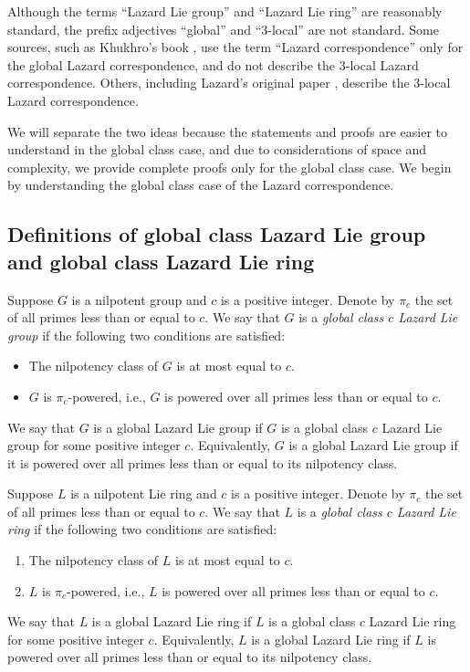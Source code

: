 Although the terms ``Lazard Lie group'' and ``Lazard Lie ring'' are
reasonably standard, the prefix adjectives ``global'' and ``3-local''
are not standard. Some sources, such as Khukhro's book \cite{Khukhro},
use the term ``Lazard correspondence'' only for the global Lazard
correspondence, and do not describe the $3$-local Lazard
correspondence. Others, including Lazard's original paper
\cite{Lazardsoriginal}, describe the $3$-local Lazard correspondence.

We will separate the two ideas because the statements and proofs are
easier to understand in the global class case, and due to
considerations of space and complexity, we provide complete proofs
only for the global class case. We begin by understanding the global
class case of the Lazard correspondence.

\subsection{Definitions of global class Lazard Lie group and global class Lazard Lie ring}

\begin{definer}
  Suppose $G$ is a nilpotent group and $c$ is a positive
  integer. Denote by $\pi_c$ the set of all primes less than or equal
  to $c$. We say that $G$ is a {\em global class $c$ Lazard Lie group}
  if the following two conditions are satisfied:

  \begin{itemize}
  \item The nilpotency class of $G$ is at most equal to $c$.
  \item $G$ is $\pi_c$-powered, i.e., $G$ is powered over all primes
    less than or equal to $c$.
  \end{itemize}

  We say that $G$ is a global Lazard Lie group if $G$ is a global
  class $c$ Lazard Lie group for some positive integer
  $c$. Equivalently, $G$ is a global Lazard Lie group if it is powered
  over all primes less than or equal to its nilpotency class.
\end{definer}

\begin{definer}
  Suppose $L$ is a nilpotent Lie ring and $c$ is a positive
  integer. Denote by $\pi_c$ the set of all primes less than or equal
  to $c$. We say that $L$ is a {\em global class $c$ Lazard Lie ring}
  if the following two conditions are satisfied:

  \begin{enumerate}
  \item The nilpotency class of $L$ is at most equal to $c$.
  \item $L$ is $\pi_c$-powered, i.e., $L$ is powered over all primes
    less than or equal to $c$.
  \end{enumerate}

  We say that $L$ is a global Lazard Lie ring if $L$ is a global class
  $c$ Lazard Lie ring for some positive integer $c$. Equivalently, $L$
  is a global Lazard Lie ring if $L$ is powered over all primes less
  than or equal to its nilpotency class.
\end{definer}

